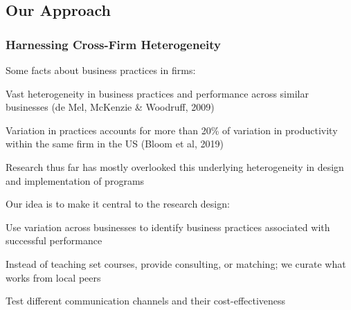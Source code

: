 \documentclass[hideothersubsections, usenames,dvipsnames,10pt]{beamer}
\newenvironment{itemize_3pt}{\itemize\addtolength{\itemsep}{3pt}}{\enditemize}
\begin{document}
\subsection{Our Approach}
\begin{frame}
\frametitle{Harnessing Cross-Firm Heterogeneity}
\begin{itemize_3pt}
\item Some facts about business practices in firms:
	\begin{itemize_3pt}	
	\item Vast heterogeneity in business practices and performance across similar businesses (de Mel, McKenzie \& Woodruff, 2009)
	\item Variation in practices accounts for more than 20\% of variation in productivity within the same firm in the US (Bloom et al, 2019)
	\end{itemize_3pt}
\vspace{0.1in}
\pause
\item Research thus far has mostly overlooked this underlying heterogeneity in design and implementation of programs
\vspace{0.1in}
\pause
\item Our idea is to make it \textcolor{bdf}{central} to the research design: 
	\begin{itemize_3pt}
	\item Use variation across businesses to identify business practices associated with successful performance
	\item Instead of teaching set courses, provide consulting, or matching; we curate what works from local peers
	\item Test different communication channels and their cost-effectiveness
\end{itemize_3pt}
\end{itemize_3pt}

\end{frame}
\end{document}
